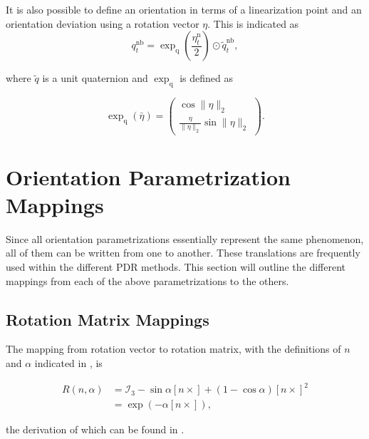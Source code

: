 It is also possible to define an orientation in terms of a linearization point and an orientation deviation using a rotation vector $\eta$. This is indicated as 
\begin{equation}
	q_{t}^{\mathrm{nb}} = \exp _{\mathrm{q}}\left(\frac{\eta_{t}^{\mathrm{n}}}{2}\right) \odot \tilde{q}_{t}^{\mathrm{nb}} \label{eq:quat_linear},
\end{equation}

where $\tilde{q}$ is a unit quaternion and $\exp_\mathrm{q}$ \cite{Kok2017} is defined as

\begin{equation}
	\exp_\mathrm{q} (\bar{\eta}) = \left(\begin{array}{c}{\cos \|\eta\|_{2}} \\ {\frac{\eta}{\|\eta\|_{2}} \sin \|\eta\|_{2}}\end{array}\right) \label{eq:exp_q}.
\end{equation}



\section{Orientation Parametrization Mappings}
Since all orientation parametrizations essentially represent the same phenomenon, all of them can be written from one to another. These translations are frequently used within the different \ac{PDR} methods. This section will outline the different mappings from each of the above parametrizations to the others.

\subsection{Rotation Matrix Mappings}
\label{sec:rotmatmappings}

The mapping from rotation vector to rotation matrix, with the definitions of $n$ and $\alpha$ indicated in , is

\begin{subequations}
	\begin{align}
		\label{eq:rotvec2rotmat}
		R\left(n, \alpha\right) &=\mathcal{I}_{3}-\sin \alpha\left[n \times\right]+(1-\cos \alpha)\left[n \times\right]^{2} \\
		& =\exp \left(-\alpha\left[n \times\right]\right),
	\end{align}
\end{subequations}


the derivation of which can be found in \citet{Kok2017}.

